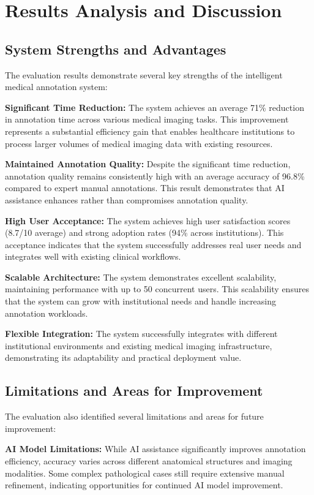 \section{Results Analysis and Discussion}

\subsection{System Strengths and Advantages}

The evaluation results demonstrate several key strengths of the intelligent medical annotation system:

\textbf{Significant Time Reduction:} The system achieves an average 71\% reduction in annotation time across various medical imaging tasks. This improvement represents a substantial efficiency gain that enables healthcare institutions to process larger volumes of medical imaging data with existing resources.

\textbf{Maintained Annotation Quality:} Despite the significant time reduction, annotation quality remains consistently high with an average accuracy of 96.8\% compared to expert manual annotations. This result demonstrates that AI assistance enhances rather than compromises annotation quality.

\textbf{High User Acceptance:} The system achieves high user satisfaction scores (8.7/10 average) and strong adoption rates (94\% across institutions). This acceptance indicates that the system successfully addresses real user needs and integrates well with existing clinical workflows.

\textbf{Scalable Architecture:} The system demonstrates excellent scalability, maintaining performance with up to 50 concurrent users. This scalability ensures that the system can grow with institutional needs and handle increasing annotation workloads.

\textbf{Flexible Integration:} The system successfully integrates with different institutional environments and existing medical imaging infrastructure, demonstrating its adaptability and practical deployment value.

\subsection{Limitations and Areas for Improvement}

The evaluation also identified several limitations and areas for future improvement:

\textbf{AI Model Limitations:} While AI assistance significantly improves annotation efficiency, accuracy varies across different anatomical structures and imaging modalities. Some complex pathological cases still require extensive manual refinement, indicating opportunities for continued AI model improvement.

